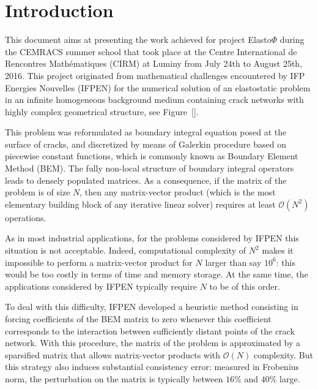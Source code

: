 

\section*{Introduction}

This document aims at presenting the work achieved for project Elasto$\Phi$ during the CEMRACS summer school  
that took place at the Centre International de Rencontres Math\'ematiques (CIRM) at Luminy from July 24th to 
August 25th, 2016. This project originated from mathematical challenges encountered by IFP Energies Nouvelles (IFPEN)
for the numerical solution of an elastostatic problem in an infinite homogeneous background medium containing crack 
networks with highly complex geometrical structure, see Figure~\ref{}. 


\bigskip
This problem was reformulated as boundary integral equation posed at the surface of cracks, and 
discretized by means of Galerkin procedure based on piecewise constant functions, which is commonly known as 
Boundary Element Method (BEM). The fully non-local structure of boundary integral operators leads to  
densely populated matrices. As a consequence, if the matrix of the problem is of size $N$, 
then any matrix-vector product (which is the most elementary building block of any iterative linear solver)
requires at least $\mathcal{O}(N^{2})$ operations.

\bigskip
As in most industrial applications, for the problems considered by IFPEN this situation is not acceptable. 
Indeed, computational complexity of $N^{2}$ makes it impossible to perform a matrix-vector product for $N$ larger than
say $10^{6}$: this would be too costly in terms of time and memory storage. At the same time, the  applications 
considered by IFPEN typically require $N$ to be of this order.

\bigskip
To deal with this difficulty, IFPEN developed a heuristic method consisting in forcing coefficients of the 
BEM matrix to zero whenever this coefficient corresponds to the interaction between sufficiently distant points 
of the crack network. With this procedure, the matrix of the problem is approximated by a sparsified matrix that 
allows matrix-vector products with $\mathcal{O}(N)$ complexity. But this strategy also induces substantial consistency 
error: measured in Frobenius norm, the perturbation on the matrix is typically between $16$\% and $40$\% large.

